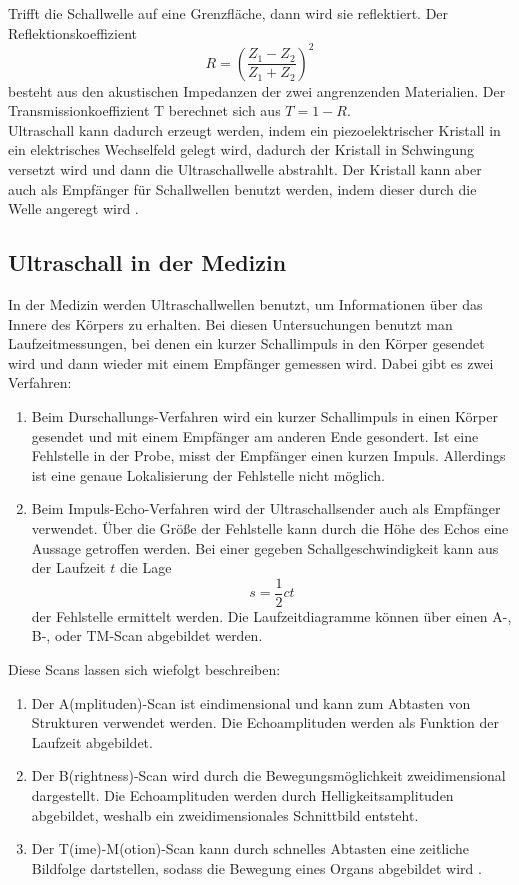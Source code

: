 Trifft die Schallwelle auf eine Grenzfläche, dann wird sie reflektiert. Der Reflektionskoeffizient
\begin{equation*}
  R=\left(\frac{Z_1-Z_2}{Z_1+Z_2}\right)^2
\end{equation*}
besteht aus den akustischen Impedanzen der zwei angrenzenden Materialien. Der Transmissionkoeffizient T berechnet sich aus $T=1-R$.\\
Ultraschall kann dadurch erzeugt werden, indem ein piezoelektrischer Kristall in ein elektrisches Wechselfeld gelegt wird, dadurch der Kristall in Schwingung versetzt wird und dann die Ultraschallwelle abstrahlt. Der Kristall kann aber auch als Empfänger für Schallwellen benutzt werden, indem dieser durch die Welle angeregt wird \cite{1}.

\subsection{Ultraschall in der Medizin}
In der Medizin werden Ultraschallwellen benutzt, um Informationen über das Innere des Körpers zu erhalten. Bei diesen Untersuchungen benutzt man Laufzeitmessungen, bei denen ein kurzer Schallimpuls in den Körper gesendet wird und dann wieder mit einem Empfänger gemessen wird. Dabei gibt es zwei Verfahren:\\
\begin{enumerate}[nosep,label=\textsc{\arabic*},leftmargin=*]
\item Beim Durschallungs-Verfahren wird ein kurzer Schallimpuls in einen Körper gesendet und mit einem Empfänger am anderen Ende gesondert. Ist eine Fehlstelle in der Probe, misst der Empfänger einen kurzen Impuls. Allerdings ist eine genaue Lokalisierung der Fehlstelle nicht möglich.
\item Beim Impuls-Echo-Verfahren wird der Ultraschallsender auch als Empfänger verwendet. Über die Größe der Fehlstelle kann durch die Höhe des Echos  eine Aussage getroffen werden. Bei einer gegeben Schallgeschwindigkeit kann aus der Laufzeit $t$ die Lage
\begin{equation*}
  s=\frac{1}{2}ct
\end{equation*}
der Fehlstelle ermittelt werden. Die Laufzeitdiagramme können über einen A-, B-, oder TM-Scan abgebildet werden.
\end{enumerate}
Diese Scans lassen sich wiefolgt beschreiben:
\begin{enumerate}[nosep,label=\textsc{\arabic*},leftmargin=*]
\item Der A(mplituden)-Scan ist eindimensional und kann zum Abtasten von Strukturen verwendet werden. Die Echoamplituden werden als Funktion der Laufzeit abgebildet.
\item Der B(rightness)-Scan wird durch die Bewegungsmöglichkeit zweidimensional dargestellt. Die Echoamplituden werden durch Helligkeitsamplituden abgebildet, weshalb ein zweidimensionales Schnittbild entsteht. 
\item Der T(ime)-M(otion)-Scan kann durch schnelles Abtasten eine zeitliche Bildfolge dartstellen, sodass die Bewegung eines Organs abgebildet wird \cite{1}. 
\end{enumerate}
